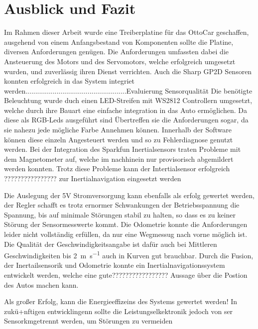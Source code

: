 \chapter{Ausblick und Fazit}

Im Rahmen dieser Arbeit wurde eine Treiberplatine für das OttoCar geschaffen, ausgehend von einem Anfangsbestand von Komponenten sollte die Platine, diversen Anforderungen genügen.
Die Anforderungen umfassten dabei die Ansteuerung des Motors und des Servomotors, welche erfolgreich umgesetzt wurden, und zuverlässig ihren Dienst verrichten.
Auch die Sharp GP2D Sensoren konnten erfolgreich in das System integriet werden....................................................Evaluierung Sensorqualität
Die benötigte Beleuchtung wurde duch einen LED-Streifen mit WS2812 Controllern umgesetzt, welche durch ihre Bauart eine einfache integration in das Auto ermöglichen.
Da diese als RGB-Leds ausgeführt sind Übertreffen sie die Anforderungen sogar, da sie nahezu jede mögliche Farbe Annehmen können. Innerhalb der Software können diese einzeln Angesteuert
werden und so zu Fehlerdiagnose genutzt werden. Bei der Integration des Sparkfun Inertialsensors traten Probleme mit dem Magnetometer auf, welche im nachhinein nur provisorisch abgemildert werden konnten.
Trotz diese Probleme kann der Intertialsensor erfolgreich ???????????????? zur Inertialnavigation eingesetzt werden %

Die Auslegung der 5V Stromversorgung kann ebenfalls als erfolg gewertet werden, der Regler schafft es trotz ernormer Schwankungen der Betriebsspannung die Spannung, bis auf minimale Störungen
stabil zu halten, so dass es zu keiner Störung der Sensormesswerte kommt. Die Odometrie konnte die Anforderungen leider nicht vollständig erfüllen, da nur eine Wegmessug nach vorne möglich ist.
Die Qualität der Geschwindigkeitsangabe ist dafür auch bei Mittleren Geschwindigkeiten bis \SI{2}{\metre\per\second} auch in Kurven gut brauchbar. Durch die Fusion, der
Inertailsensorik und Odometrie konnte ein Inertialnavigationssystem
entwickelt werden, welche eine gute????????????????? Aussage über die Postion des Autos machen kann.

Als großer Erfolg, kann die Energieeffizeins des Systems gewertet werden! 
In zukü+nftigen entwicklingenn sollte die Leistungselkektronik jedoch von ser Sensorkmgetrennt werden, um Störungen zu vermeiden

